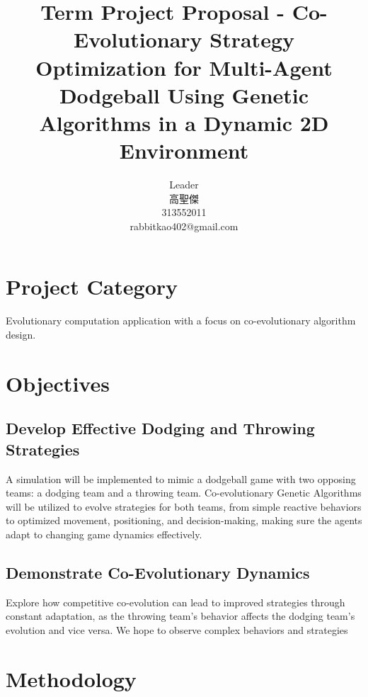 \documentclass[12pt,letterpaper]{article}
\begin{document}
\begin{CJK}{UTF8}{bkai}
    \title{Term Project Proposal - Co-Evolutionary Strategy Optimization for Multi-Agent Dodgeball Using Genetic Algorithms in a Dynamic 2D Environment}
    
    \author{
        Leader\\
        高聖傑\\
        313552011\\
        rabbitkao402@gmail.com
    }

    \maketitle
\end{CJK}

\section{Project Category}
Evolutionary computation application with a focus on co-evolutionary algorithm design.

\section{Objectives}
\subsection{Develop Effective Dodging and Throwing Strategies}
A simulation will be implemented to mimic a dodgeball game with two opposing teams: a dodging team and a throwing team.
Co-evolutionary Genetic Algorithms will be utilized to evolve strategies for both teams, from simple reactive behaviors to optimized movement, positioning, and decision-making, making sure the agents adapt to changing game dynamics effectively.

\subsection{Demonstrate Co-Evolutionary Dynamics}
Explore how competitive co-evolution can lead to improved strategies through constant adaptation, as the throwing team's behavior affects the dodging team's evolution and vice versa. We hope to observe complex behaviors and strategies

\section{Methodology}
\end{document}
